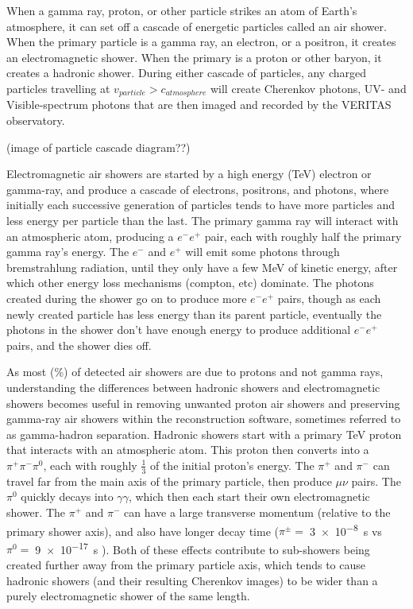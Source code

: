 When a gamma ray, proton, or other particle strikes an atom of Earth's atmosphere, it can set off a cascade of energetic particles called an air shower.
When the primary particle is a gamma ray, an electron, or a positron, it creates an electromagnetic shower.
When the primary is a proton or other baryon, it creates a hadronic shower.
During either cascade of particles, any charged particles travelling at $v_{particle} > c_{atmosphere}$ will create Cherenkov photons, UV- and Visible-spectrum photons that are then imaged and recorded by the VERITAS observatory.

{\color{red}(image of particle cascade diagram??)}

Electromagnetic air showers are started by a high energy (\nicetilde TeV) electron or gamma-ray, and produce a cascade of electrons, positrons, and photons, where initially each successive generation of particles tends to have more particles and less energy per particle than the last.
The primary gamma ray will interact with an atmospheric atom, producing a $e^{-}e^{+}$ pair, each with roughly half the primary gamma ray's energy.
The $e^{-}$ and $e^{+}$ will emit some photons through bremstrahlung radiation, until they only have a few MeV of kinetic energy, after which other energy loss mechanisms (compton, etc) dominate.
The photons created during the shower go on to produce more $e^{-}e^{+}$ pairs, though as each newly created particle has less energy than its parent particle, eventually the photons in the shower don't have enough energy to produce additional $e^{-}e^{+}$ pairs, and the shower dies off.

As most (\%) of detected air showers are due to protons and not gamma rays, understanding the differences between hadronic showers and electromagnetic showers becomes useful in removing unwanted proton air showers and preserving gamma-ray air showers within the reconstruction software, sometimes referred to as gamma-hadron separation.
Hadronic showers start with a primary \nicetilde TeV proton that interacts with an atmospheric atom.
This proton then converts into a $\pi^{+}\pi^{-}\pi^{0}$, each with roughly \nicetilde $\frac{1}{3}$ of the initial proton's energy.
The $\pi^{+}$ and $\pi^{-}$ can travel far from the main axis of the primary particle, then produce $\mu\nu$ pairs.
The $\pi^{0}$ quickly decays into $\gamma\gamma$, which then each start their own electromagnetic shower.
The $\pi^{+}$ and $\pi^{-}$ can have a large transverse momentum (relative to the primary shower axis), and also have longer decay time ($\pi^{\pm}=\;$\SI{3e-8}{s} vs $\pi^{0}=\;$\SI{9e-17}{s} \cite{pdg_2014} ).
Both of these effects contribute to sub-showers being created further away from the primary particle axis, which tends to cause hadronic showers (and their resulting Cherenkov images) to be wider than a purely electromagnetic shower of the same length. 

